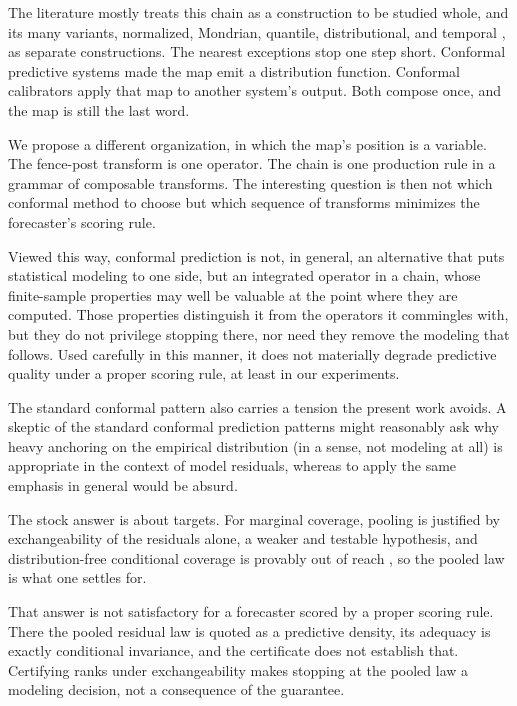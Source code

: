 \documentclass[11pt]{article}
\theoremstyle{remark}
\begin{document}
The literature mostly treats this chain as a
construction to be studied whole, and its many variants, normalized, Mondrian, quantile,
distributional, and temporal
\citep{bostrom2021mondrian,romano2019conformalized,chernozhukov2021distributional,gibbs2021adaptive,auer2023hopcpt},
as separate constructions. The nearest exceptions stop one step short. Conformal
predictive systems made the map emit a distribution function. Conformal calibrators
\citep{vovk2020calibrators} apply that map to another system's output. Both compose
once, and the map is still the last word.

We propose a different organization, in
which the map's position is a variable. The fence-post transform is
one operator. The chain is one production rule in a grammar of composable transforms. The
interesting question is then not which conformal method to choose but which sequence of
transforms minimizes the forecaster's scoring rule.

Viewed this way, conformal prediction is not, in general, an alternative that puts
statistical modeling to one side, but an integrated operator in a chain, whose
finite-sample properties may well be valuable at the point where they are computed.
Those properties distinguish it from the operators it commingles with, but they do
not privilege stopping there, nor need they remove the modeling that follows. Used
carefully in this manner, it does not materially degrade predictive quality under a
proper scoring rule, at least in our experiments.

The standard conformal pattern also carries a tension the present work avoids. A
skeptic of the standard conformal prediction patterns might reasonably ask why heavy
anchoring on the empirical distribution (in a sense, not modeling at all) is
appropriate in the context of model residuals, whereas to apply the same emphasis in
general would be absurd.

The stock answer is about targets. For marginal coverage, pooling is justified by
exchangeability of the residuals alone, a weaker and testable hypothesis, and
distribution-free conditional coverage is provably out of reach
\citep{vovk2012conditional,lei2014distribution,barber2021limits}, so the pooled law
is what one settles for.

That answer is not satisfactory for a forecaster scored by a
proper scoring rule. There the pooled residual law is quoted as a predictive density,
its adequacy is exactly conditional invariance, and the certificate does not establish
that. Certifying ranks under exchangeability makes stopping at the pooled law a
modeling decision, not a consequence of the guarantee.
\end{document}
